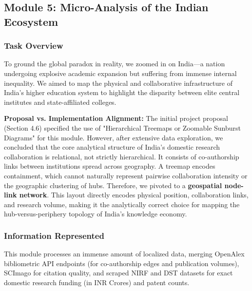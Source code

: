 \documentclass[12pt,a4paper]{article}
\begin{document}
\subsection{Module 5: Micro-Analysis of the Indian Ecosystem}

\subsubsection{Task Overview}
To ground the global paradox in reality, we zoomed in on India---a nation undergoing explosive academic expansion but suffering from immense internal inequality. We aimed to map the physical and collaborative infrastructure of India's higher education system to highlight the disparity between elite central institutes and state-affiliated colleges.

\textbf{Proposal vs. Implementation Alignment:} The initial project proposal (Section 4.6) specified the use of "Hierarchical Treemaps or Zoomable Sunburst Diagrams" for this module. However, after extensive data exploration, we concluded that the core analytical structure of India's domestic research collaboration is relational, not strictly hierarchical. It consists of co-authorship links between institutions spread across geography. A treemap encodes containment, which cannot naturally represent pairwise collaboration intensity or the geographic clustering of hubs. Therefore, we pivoted to a \textbf{geospatial node-link network}. This layout directly encodes physical position, collaboration links, and research volume, making it the analytically correct choice for mapping the hub-versus-periphery topology of India's knowledge economy.

\subsubsection{Information Represented}
This module processes an immense amount of localized data, merging OpenAlex bibliometric API endpoints (for co-authorship edges and publication volumes), SCImago for citation quality, and scraped NIRF and DST datasets for exact domestic research funding (in INR Crores) and patent counts. 
\end{document}
